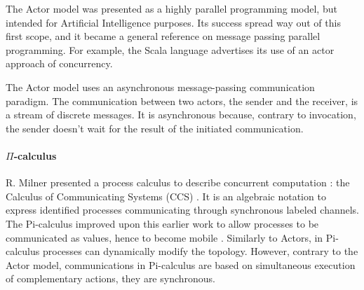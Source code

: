 The Actor model was presented as a highly parallel programming model, but intended for Artificial Intelligence purposes.
Its success spread way out of this first scope, and it became a general reference on message passing parallel programming.
For example, the Scala language advertises its use of an actor approach of concurrency.


The Actor model uses an asynchronous message-passing communication paradigm.
The communication between two actors, the sender and the receiver, is a stream of discrete messages.
It is asynchronous because, contrary to invocation, the sender doesn't wait for the result of the initiated communication.

\paragraph{$\Pi$-calculus}

R. Milner presented a process calculus to describe concurrent computation : the Calculus of Communicating Systems (CCS) \cite{Milner1975, Milner1980}.
It is an algebraic notation to express identified processes communicating through synchronous labeled channels.
The Pi-calculus improved upon this earlier work to allow processes to be communicated as values, hence to become mobile \cite{Engberg1986,Milner1992a,Milner1992}.
Similarly to Actors, in Pi-calculus processes can dynamically modify the topology.
However, contrary to the Actor model, communications in Pi-calculus are based on simultaneous execution of complementary actions, they are synchronous.




